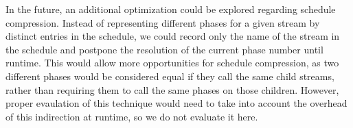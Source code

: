 

In the future, an additional optimization could be explored regarding
schedule compression.  Instead of representing different phases for a
given stream by distinct entries in the schedule, we could record only
the name of the stream in the schedule and postpone the resolution of
the current phase number until runtime.  This would allow more
opportunities for schedule compression, as two different phases would
be considered equal if they call the same child streams, rather than
requiring them to call the same phases on those children.  However,
proper evaulation of this technique would need to take into account
the overhead of this indirection at runtime, so we do not evaluate it
here.